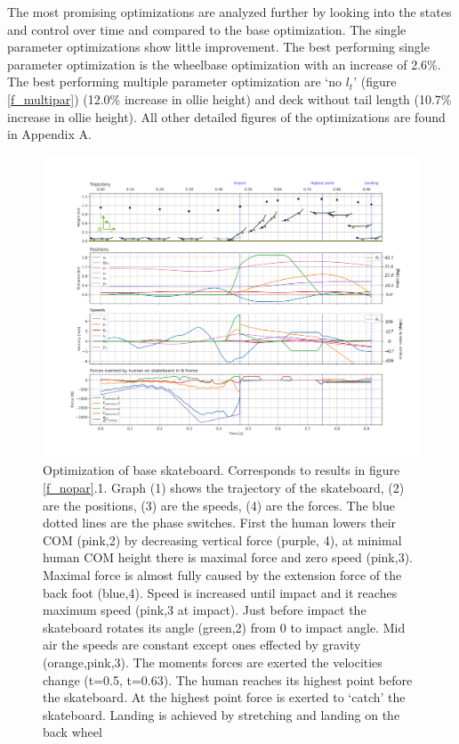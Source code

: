 The most promising optimizations are analyzed further by looking into the states and control over time and compared to the base optimization. The single parameter optimizations show little improvement. The best performing single parameter optimization is the wheelbase optimization with an increase of 2.6\%. The best performing multiple parameter optimization are `no $l_t$' (figure \ref{f_multipar}) (12.0\% increase in ollie height) and deck without tail length (10.7\% increase in ollie height).  All other detailed figures of the optimizations are found in Appendix A. 
\begin{figure}
    \centering
    \includegraphics[trim={0cm 0cm 0cm 0cm},clip,width=\textwidth]{figure/Results/data_basedpi600.png}
    \vspace{-1.5cm}\caption[Trajectory, positions, speeds, and forces of base optimization]{Optimization of base skateboard. Corresponds to results in figure \ref{f_nopar}.1. Graph (1) shows the trajectory of the skateboard, (2) are the positions, (3) are the speeds, (4) are the forces. The blue dotted lines are the phase switches. First the human lowers their COM (pink,2) by decreasing vertical force (purple, 4), at minimal human COM height there is maximal force and zero speed (pink,3). Maximal force is almost fully caused by the extension force of the back foot (blue,4). Speed is increased until impact and it reaches maximum speed (pink,3 at impact). Just before impact the skateboard rotates its angle (green,2) from 0 to impact angle. Mid air the speeds are constant except ones effected by gravity (orange,pink,3). The moments forces are exerted the velocities change (t=0.5, t=0.63). The human reaches its highest point before the skateboard. At the highest point force is exerted to `catch' the skateboard. Landing is achieved by stretching and landing on the back wheel }
    \label{f_noparameter}
\end{figure}
